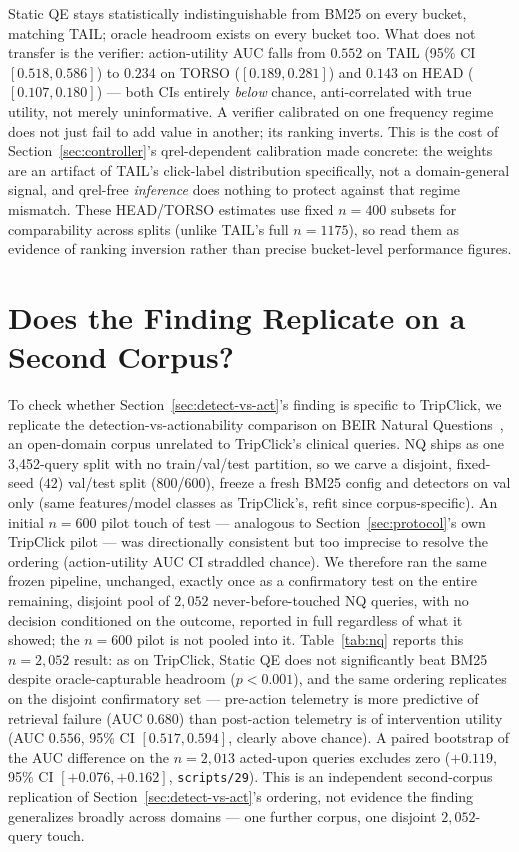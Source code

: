 \documentclass[conference]{IEEEtran}
\begin{document}
Static QE stays statistically indistinguishable from BM25 on every
bucket, matching TAIL; oracle headroom exists on every bucket too.
What does not transfer is the verifier: action-utility AUC falls from
$0.552$ on TAIL (95\% CI $[0.518,0.586]$) to $0.234$ on TORSO
($[0.189,0.281]$) and $0.143$ on HEAD ($[0.107,0.180]$) --- both CIs
entirely \emph{below} chance, anti-correlated with true utility, not
merely uninformative. A verifier calibrated on one frequency regime
does not just fail to add value in another; its ranking inverts. This
is the cost of Section~\ref{sec:controller}'s qrel-dependent
calibration made concrete: the weights are an artifact of TAIL's
click-label distribution specifically, not a domain-general signal,
and qrel-free \emph{inference} does nothing to protect against that
regime mismatch. These
HEAD/TORSO estimates use fixed $n{=}400$ subsets for comparability
across splits (unlike TAIL's full $n{=}1175$), so read them as evidence
of ranking inversion rather than precise bucket-level performance
figures.

\section{Does the Finding Replicate on a Second Corpus?}
\label{sec:nq}

To check whether Section~\ref{sec:detect-vs-act}'s finding is specific
to TripClick, we replicate the detection-vs-actionability comparison on
BEIR Natural Questions~\cite{beir,natural-questions}, an open-domain
corpus unrelated to TripClick's clinical queries. NQ ships as one
3{,}452-query split with no train/val/test partition, so we carve a
disjoint, fixed-seed ($42$) val/test split (800/600), freeze a fresh
BM25 config and detectors on val only (same features/model classes as
TripClick's, refit since corpus-specific). An initial $n{=}600$ pilot
touch of test --- analogous to Section~\ref{sec:protocol}'s own
TripClick pilot --- was directionally consistent but too imprecise to
resolve the ordering (action-utility AUC CI straddled chance). We
therefore ran the same frozen pipeline, unchanged, exactly once as a
confirmatory test on the entire remaining, disjoint pool of $2{,}052$
never-before-touched NQ queries, with no decision conditioned on the
outcome, reported in full regardless of what it showed; the $n{=}600$
pilot is not pooled into it.
Table~\ref{tab:nq} reports this $n{=}2{,}052$ result: as on TripClick,
Static QE does not significantly beat BM25 despite oracle-capturable
headroom ($p<0.001$), and the same ordering replicates on the disjoint
confirmatory set --- pre-action telemetry is more predictive of retrieval
failure (AUC $0.680$) than post-action telemetry is of intervention
utility (AUC $0.556$, 95\% CI $[0.517,0.594]$, clearly above chance).
A paired bootstrap of the AUC difference on the $n{=}2{,}013$
acted-upon queries excludes zero ($+0.119$, 95\% CI
$[+0.076,+0.162]$, \texttt{scripts/29}). This is an
independent second-corpus replication of
Section~\ref{sec:detect-vs-act}'s ordering, not evidence the finding
generalizes broadly across domains --- one further corpus, one
disjoint $2{,}052$-query touch.
\end{document}
